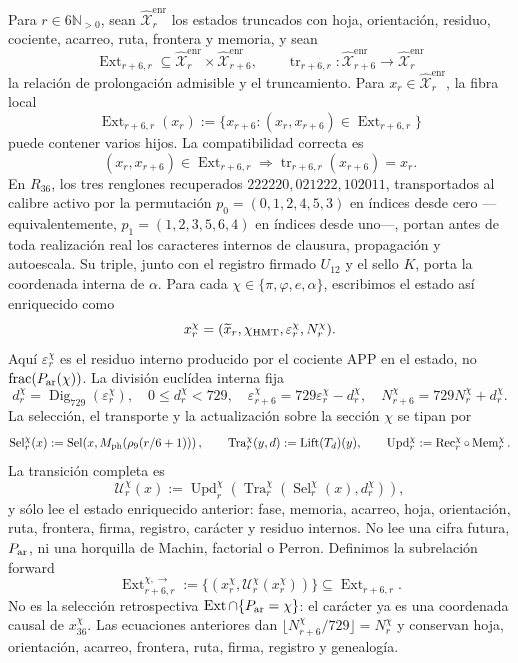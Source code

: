 Para \(r\in6\mathbb N_{>0}\), sean
\(\widehat{\mathcal X}^{\mathrm{enr}}_r\) los estados truncados con hoja,
orientación, residuo, cociente, acarreo, ruta, frontera y memoria, y sean
\[
 \operatorname{Ext}_{r+6,r}\subseteq
 \widehat{\mathcal X}^{\mathrm{enr}}_r\times
 \widehat{\mathcal X}^{\mathrm{enr}}_{r+6},
 \qquad
 \operatorname{tr}_{r+6,r}:
 \widehat{\mathcal X}^{\mathrm{enr}}_{r+6}
 \longrightarrow
 \widehat{\mathcal X}^{\mathrm{enr}}_r
\]
la relación de prolongación admisible y el truncamiento. Para
\(x_r\in\widehat{\mathcal X}^{\mathrm{enr}}_r\), la fibra local
\[
 \operatorname{Ext}_{r+6,r}(x_r)
 :=\{x_{r+6}:(x_r,x_{r+6})\in\operatorname{Ext}_{r+6,r}\}
\]
puede contener varios hijos. La compatibilidad correcta es
\[
 (x_r,x_{r+6})\in\operatorname{Ext}_{r+6,r}
 \Longrightarrow
 \operatorname{tr}_{r+6,r}(x_{r+6})=x_r.
\]
En \(R_{36}\), los tres renglones recuperados
\(222220,021222,102011\), transportados al calibre activo por la permutación
\(p_0=(0,1,2,4,5,3)\) en índices desde cero ---equivalentemente,
\(p_1=(1,2,3,5,6,4)\) en índices desde uno---, portan antes de toda
realización real los caracteres
internos de clausura, propagación y autoescala. Su triple, junto con el
registro firmado \(U_{12}\) y el sello \(K\), porta la coordenada interna de
\(\alpha\). Para cada
\(\chi\in\{\pi,\varphi,e,\alpha\}\), escribimos el estado así enriquecido
como
\[
 x_r^\chi=(\widetilde x_r,\chi_{\rm HMT},
            \varepsilon_r^\chi,N_r^\chi).
\]
Aquí \(\varepsilon_r^\chi\) es el residuo interno producido por el cociente
APP en el estado, no \(\operatorname{frac}(P_{\rm ar}(\chi))\). La división
euclídea interna fija
\[
 d_r^\chi=\operatorname{Dig}_{729}(\varepsilon_r^\chi),
 \quad 0\le d_r^\chi<729,
 \quad
 \varepsilon_{r+6}^\chi=729\varepsilon_r^\chi-d_r^\chi,
 \quad
 N_{r+6}^\chi=729N_r^\chi+d_r^\chi.
\]
La selección, el transporte y la actualización sobre la sección
\(\chi\) se tipan por
\[
 \operatorname{Sel}_r^\chi(x)
 :=\operatorname{Sel}\!\left(
 x,M_{\rm ph}(\rho_9(r/6+1))\right),
 \qquad
 \operatorname{Tra}_r^\chi(y,d):=\operatorname{Lift}(T_d)(y),
 \qquad
 \operatorname{Upd}_r^\chi:=\operatorname{Rec}_r^\chi\circ
 \operatorname{Mem}_r^\chi.
\]
La transición completa es
\[
 \mathcal U_r^\chi(x)
 :=\operatorname{Upd}_r^\chi\!\left(
  \operatorname{Tra}_r^\chi\!\left(
   \operatorname{Sel}_r^\chi(x),d_r^\chi
  \right)\right),
\]
y sólo lee el estado enriquecido anterior: fase, memoria, acarreo, hoja,
orientación, ruta, frontera, firma, registro, carácter y residuo internos.
No lee una cifra futura, \(P_{\rm ar}\), ni una horquilla de Machin,
factorial o Perron. Definimos la subrelación forward
\[
 \operatorname{Ext}^{\chi,\rightarrow}_{r+6,r}
 :=\{(x_r^\chi,\mathcal U_r^\chi(x_r^\chi))\}
 \subseteq\operatorname{Ext}_{r+6,r}.
\]
No es la selección retrospectiva
\(\operatorname{Ext}\cap\{P_{\rm ar}=\chi\}\): el carácter ya es una
coordenada causal de \(x_{36}^\chi\). Las ecuaciones anteriores dan
\(\lfloor N_{r+6}^\chi/729\rfloor=N_r^\chi\) y conservan hoja, orientación,
acarreo, frontera, ruta, firma, registro y genealogía.

